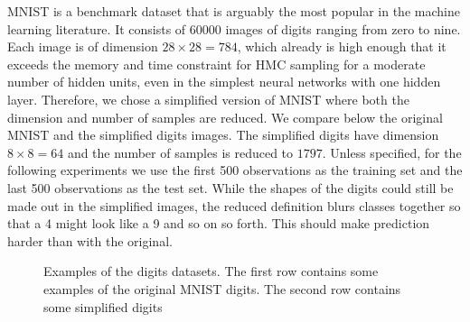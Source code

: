 \documentclass[12pt]{report}
\begin{document}
MNIST \cite{lecun-mnisthandwrittendigit-2010} is a benchmark dataset that is arguably the most popular in the machine learning literature. It consists of 60000 images of digits ranging from zero to nine. Each image is of dimension $ 28 \times 28 = 784 $, which already is high enough that it exceeds the memory and time constraint for HMC sampling for a moderate number of hidden units, even in the simplest neural networks with one hidden layer. Therefore, we chose a simplified version of MNIST \cite{scikit-learn} where both the dimension and number of samples are reduced. We compare below the original MNIST and the simplified digits images. The simplified digits have dimension $8 \times 8 = 64 $ and the number of samples is reduced to $1797$. Unless specified, for the following experiments we use the first 500 observations as the training set and the last 500 observations as the test set. While the shapes of the digits could still be made out in the simplified images, the reduced definition blurs classes together so that a 4 might look like a 9 and so on so forth. This should make prediction harder than with the original.

\begin{figure}
\begin{tcbraster}[raster columns=5, enhanced, blankest]

\end{tcbraster}
\caption{Examples of the digits datasets. The first row contains some examples of the original MNIST digits. The second row contains some simplified digits}
\end{figure}
\end{document}
